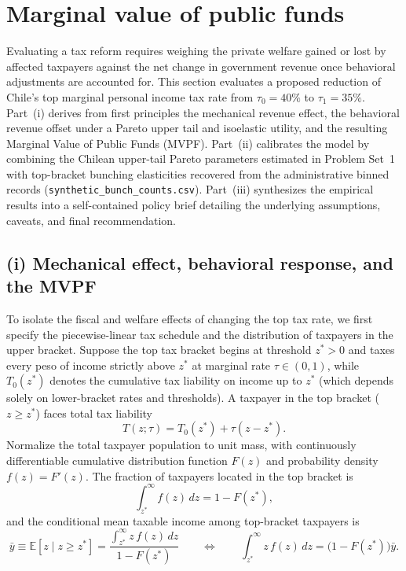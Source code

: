 \section{Marginal value of public funds}

Evaluating a tax reform requires weighing the private welfare gained or lost by affected taxpayers against the net change in government revenue once behavioral adjustments are accounted for. This section evaluates a proposed reduction of Chile's top marginal personal income tax rate from $\tau_0 = 40\%$ to $\tau_1 = 35\%$. Part~(i) derives from first principles the mechanical revenue effect, the behavioral revenue offset under a Pareto upper tail and isoelastic utility, and the resulting Marginal Value of Public Funds (MVPF). Part~(ii) calibrates the model by combining the Chilean upper-tail Pareto parameters estimated in Problem Set~1 with top-bracket bunching elasticities recovered from the administrative binned records (\texttt{synthetic\_bunch\_counts.csv}). Part~(iii) synthesizes the empirical results into a self-contained policy brief detailing the underlying assumptions, caveats, and final recommendation.

\subsection*{(i) Mechanical effect, behavioral response, and the MVPF}

To isolate the fiscal and welfare effects of changing the top tax rate, we first specify the piecewise-linear tax schedule and the distribution of taxpayers in the upper bracket. Suppose the top tax bracket begins at threshold $z^* > 0$ and taxes every peso of income strictly above $z^*$ at marginal rate $\tau \in (0, 1)$, while $T_0(z^*)$ denotes the cumulative tax liability on income up to $z^*$ (which depends solely on lower-bracket rates and thresholds). A taxpayer in the top bracket ($z \ge z^*$) faces total tax liability
\begin{equation}
T(z; \tau) = T_0(z^*) + \tau(z - z^*).
\label{eq:p3_tax_func}
\end{equation}
Normalize the total taxpayer population to unit mass, with continuously differentiable cumulative distribution function $F(z)$ and probability density $f(z) = F'(z)$. The fraction of taxpayers located in the top bracket is
\begin{equation}
\int_{z^*}^\infty f(z)\,dz = 1 - F(z^*),
\label{eq:p3_top_mass}
\end{equation}
and the conditional mean taxable income among top-bracket taxpayers is
\begin{equation}
\bar{y} \equiv \mathbb{E}[z \mid z \ge z^*] = \frac{\int_{z^*}^\infty z\,f(z)\,dz}{1 - F(z^*)}
\qquad\Longleftrightarrow\qquad
\int_{z^*}^\infty z\,f(z)\,dz = \big(1 - F(z^*)\big)\bar{y}.
\label{eq:p3_ybar_def}
\end{equation}

